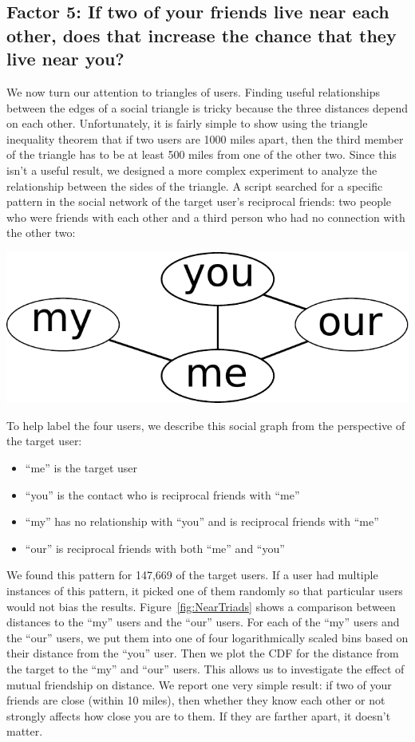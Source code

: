 \documentclass[letterpaper]{article}
\begin{document}
\subsection{Factor 5: If two of your friends live near each other, does that increase the
chance that they live near you?}

We now turn our attention to triangles of users.
Finding useful relationships between the edges of a social triangle is tricky
because the three distances depend on each other.
Unfortunately, it is fairly simple to show using the triangle inequality theorem
that if two users are 1000 miles apart, then the third member of the triangle
has to be at least 500 miles from one of the other two.
Since this isn't a useful result, we designed a more complex experiment to
analyze the relationship between the sides of the triangle.
A script searched for a specific pattern in the social network of
the target user's reciprocal friends: two people who were friends with each
other and a third person who had no connection with the other two:

\begin{center}
\includegraphics[width=0.3\linewidth]{figures/near_triads_dia.pdf}
\end{center}

To help label the four users, we describe this social graph from the
perspective of the target user:

\begin{itemize}
\item ``me'' is the target user
\item ``you'' is the contact who is reciprocal friends with ``me''
\item ``my'' has no relationship with ``you'' and is reciprocal friends with ``me''
\item ``our'' is reciprocal friends with both ``me'' and ``you''
\end{itemize}

We found this pattern for 147,669 of the target users.
%
If a user had multiple instances of this pattern, it picked one of them
randomly so that particular users would not bias the results.
%
%
Figure~\ref{fig:NearTriads} shows a comparison between distances to the ``my''
users and the ``our'' users.
%
For each of the ``my'' users and the ``our'' users, we put them into one of
four logarithmically scaled bins based on their distance from the ``you'' user.
%
Then we plot the CDF for the distance from the target to the ``my'' and ``our'' users.
%
This allows us to investigate the effect of mutual friendship on distance.
We report one very simple result: if two of your friends are close (within 10
miles), then whether they know each other or not strongly affects how close
you are to them.
%
If they are farther apart, it doesn't matter.
\end{document}
